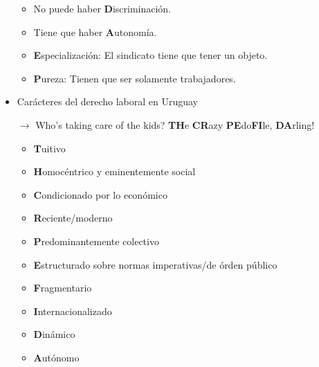 \documentclass[spanish,12pt,a4paper,titlepage]{report}
\begin{document}
\begin{itemize}
\begin{itemize}
\item No puede haber \textbf{D}iscriminación.
\item Tiene que haber \textbf{A}utonomía.
\item \textbf{E}specialización: El sindicato tiene que tener un objeto.
\item \textbf{P}ureza: Tienen que ser solamente trabajadores.
\end{itemize}

\item Carácteres del derecho laboral en Uruguay

$\rightarrow$ Who's taking care of the kids? \textbf{TH}e \textbf{CR}azy \textbf{PE}do\textbf{FI}le, \textbf{DA}rling!

\begin{itemize}
\item \textbf{T}uitivo
\item \textbf{H}omocéntrico y eminentemente social
\item \textbf{C}ondicionado por lo económico
\item \textbf{R}eciente/moderno
\item \textbf{P}redominantemente colectivo
\item \textbf{E}structurado sobre normas imperativas/de órden público
\item \textbf{F}ragmentario
\item \textbf{I}nternacionalizado
\item \textbf{D}inámico
\item \textbf{A}utónomo
\end{itemize}

\end{itemize}
\end{document}
